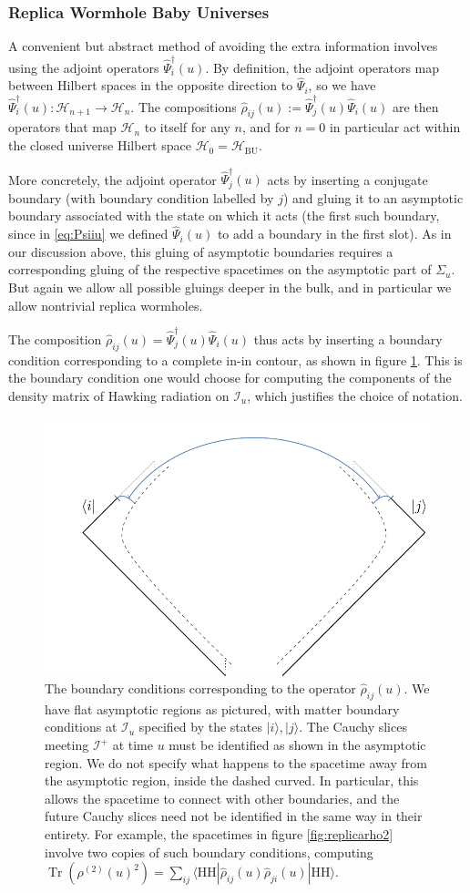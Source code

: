 \documentclass[letterpaper,12pt]{article}
\newcommand*{\hilb}{\mathcal{H}}	%
\newcommand*{\hbu}{\mathcal{H}_\text{BU}} %
\DeclareMathOperator{\Tr}{Tr}
\newcommand*{\scri}{\mathscr{I}} %
\newcommand{\HH}{\mathrm{HH}} %
\begin{document}
\subsubsection{Replica Wormhole Baby Universes}

A convenient but abstract method of avoiding the extra information involves using the adjoint operators $\hat{\Psi}_i^\dag(u)$.  By definition, the adjoint operators map between Hilbert spaces in the opposite direction to $\hat{\Psi}_i$, so we have $\hat{\Psi}_i^\dag(u): \hilb_{n+1}\to  \hilb_{n}$. The compositions $\hat{\rho}_{ij}(u) := \hat{\Psi}_j^\dag(u)\hat{\Psi}_i(u)$ are then operators that map $\hilb_{n}$ to itself for any $n$, and for $n=0$ in particular act within the closed universe Hilbert space $\hilb_0 = \hbu$.

More concretely, the adjoint operator $\hat{\Psi}_j^\dag(u)$ acts by inserting a conjugate boundary (with boundary condition labelled by $j$) and gluing it to  an asymptotic boundary associated with the state on which it acts (the first such boundary, since in \eqref{eq:Psiiu} we defined $\hat{\Psi}_i(u)$ to add a boundary in the first slot).   As in our discussion above, this gluing of asymptotic boundaries requires a corresponding gluing of the respective spacetimes on the asymptotic part of $\Sigma_u$.  But again we allow all possible gluings deeper in the bulk, and in particular we allow nontrivial replica wormholes.

The composition  $\hat{\rho}_{ij}(u)= \hat{\Psi}_j^\dag(u)\hat{\Psi}_i(u)$ thus acts by inserting a boundary condition corresponding to a complete in-in contour, as shown in figure \ref{fig:rhouBC}. This is the boundary condition one would choose for computing the components of the density matrix of Hawking radiation on $\scri_u$, which justifies the choice of notation.
\begin{figure}
	\centering
	\quad
	\includegraphics[width=.45\textwidth]{rhouBC}
		\caption{The boundary conditions corresponding to the operator $\hat{\rho}_{ij}(u)$. We have flat asymptotic regions as pictured, with matter boundary conditions at $\scri_u$ specified by the states $|i\rangle,|j\rangle$. The Cauchy slices meeting $\scri^+$ at time $u$ must be identified as shown in the asymptotic region. We do not specify what happens to the spacetime away from the asymptotic region, inside the dashed curved. In particular, this allows the spacetime to connect with other boundaries, and the future Cauchy slices need not be identified in the same way in their entirety. For example, the spacetimes in figure \ref{fig:replicarho2} involve two copies of such boundary conditions, computing $\Tr(\rho^{(2)}(u)^2) = \sum_{ij}\langle\HH|\hat{\rho}_{ij}(u)\hat{\rho}_{ji}(u)|\HH\rangle$. \label{fig:rhouBC}}
\end{figure}
\end{document}
